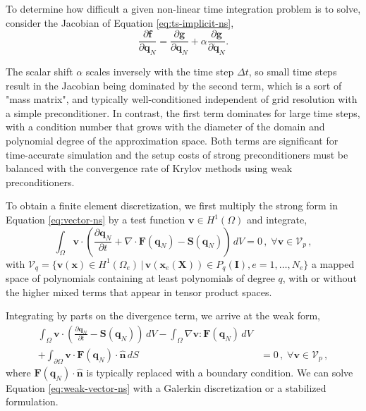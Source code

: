 To determine how difficult a given non-linear time integration problem is to solve, consider the Jacobian of Equation \ref{eq:ts-implicit-ns},
\begin{equation}
       \frac{\partial \mathbf f}{\partial \mathbf q_N}
       = \frac{\partial \mathbf g}{\partial \mathbf q_N}
       + \alpha \frac{\partial \mathbf g}{\partial \mathbf{\dot q}_N}.
\end{equation}

The scalar shift $\alpha$ scales inversely with the time step $\Delta t$, so small time steps result in the Jacobian being dominated by the second term, which is a sort of "mass matrix", and typically well-conditioned independent of grid resolution with a simple preconditioner.
In contrast, the first term dominates for large time steps, with a condition number that grows with the diameter of the domain and polynomial degree of the approximation space.
Both terms are significant for time-accurate simulation and the setup costs of strong preconditioners must be balanced with the convergence rate of Krylov methods using weak preconditioners.

To obtain a finite element discretization, we first multiply the strong form in Equation \ref{eq:vector-ns} by a test function $\mathbf v \in H^1 \left( \Omega \right)$ and integrate,
\begin{equation}
   \int_{\Omega} \mathbf v \cdot \left(\frac{\partial \mathbf{q}_N}{\partial t} + \nabla \cdot \mathbf{F}(\mathbf{q}_N) - \mathbf{S}(\mathbf{q}_N) \right) \,dV = 0 \, , \; \forall \mathbf v \in \mathcal{V}_p\,,
\end{equation}
with $\mathcal{V}_q = \{ \mathbf v(\mathbf x) \in H^{1} \left( \Omega_e \right) \,|\, \mathbf v(\mathbf x_e(\mathbf X)) \in P_q(\mathbf{I}), e = 1,\ldots,N_e \}$ a mapped space of polynomials containing at least polynomials of degree $q$, with or without the higher mixed terms that appear in tensor product spaces.

Integrating by parts on the divergence term, we arrive at the weak form,
\begin{equation}
   \begin{aligned}
   \int_{\Omega} \mathbf v \cdot \left( \frac{\partial \mathbf{q}_N}{\partial t} - \mathbf{S}(\mathbf{q}_N) \right)  \,dV
   - \int_{\Omega} \nabla \mathbf v \!:\! \mathbf{F}(\mathbf{q}_N)\,dV & \\
   + \int_{\partial \Omega} \mathbf v \cdot \mathbf{F}(\mathbf q_N) \cdot \hat{\mathbf{n}} \,dS
     &= 0 \, , \; \forall \mathbf v \in \mathcal{V}_p \,,
   \end{aligned}
   \label{eq:weak-vector-ns}
\end{equation}
where $\mathbf{F}(\mathbf q_N) \cdot \hat{\mathbf{n}}$ is typically replaced with a boundary condition.
We can solve Equation \ref{eq:weak-vector-ns} with a Galerkin discretization or a stabilized formulation.

